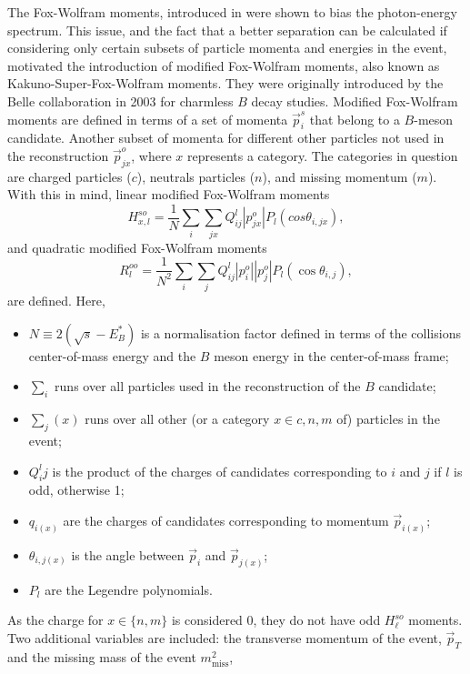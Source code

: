 The Fox-Wolfram moments, introduced in  were shown to bias the photon-energy spectrum.
This issue, and the fact that a better separation can be calculated if considering only certain subsets of particle momenta and energies in the event,
motivated the introduction of modified Fox-Wolfram moments, also known as Kakuno-Super-Fox-Wolfram moments.
They were originally introduced by the Belle collaboration in 2003 \cite{Belle:2003fgr} for charmless $B$ decay studies.
Modified Fox-Wolfram moments are defined in terms of a set of momenta $\vec{p}^{s}_i$ that belong to a $B$-meson candidate.
Another subset of momenta for different other particles not used in the reconstruction $\vec{p}^{o}_{jx}$, where $x$ represents a category.
The categories in question are charged particles ($c$), neutrals particles ($n$), and missing momentum ($m$).
With this in mind, linear modified Fox-Wolfram moments 
\begin{equation}
    H_{x,l}^{so} = \frac{1}{N} \sum_i \sum_{jx} Q^{l}_{ij}|p^o_{jx}|P_l(cos\theta_{i,jx}),
\end{equation}
and quadratic modified Fox-Wolfram moments
\begin{equation}
    R_{l}^{oo} = \frac{1}{N^2} \sum_i \sum_j Q^{l}_{ij} |p^o_i||p^o_j|P_l(\cos\theta_{i,j}),
\end{equation}
are defined.
Here, 
\begin{itemize}
\item $N\equiv 2(\sqrt{s}-E^{*}_B)$ is a normalisation factor defined in terms of the collisions center-of-mass energy and the $B$ meson energy in the center-of-mass frame;
\item $\sum_i$ runs over all particles used in the reconstruction of the $B$ candidate;
\item $\sum_j(x)$ runs over all other (or a category $x\in{c,n,m}$ of) particles in the event;
\item $Q^{l}_ij$ is the product of the charges of candidates corresponding to $i$ and $j$ if $l$ is odd, otherwise 1;
\item $q_{i(x)}$ are the charges of candidates corresponding to momentum $\vec{p}_{i(x)}$;
\item $\theta_{i,j(x)}$ is the angle between $\vec{p}_i$ and $\vec{p}_{j(x)}$;
\item $P_l$ are the Legendre polynomials.
\end{itemize}
As the charge for $x\in\{n,m\}$ is considered 0, they do not have odd $H^{so}_{\ell}$ moments.
Two additional variables are included: the transverse momentum of the event, $\vec{p}_{T}$ and the missing mass of the event $m_{\mathrm{miss}}^2$,
